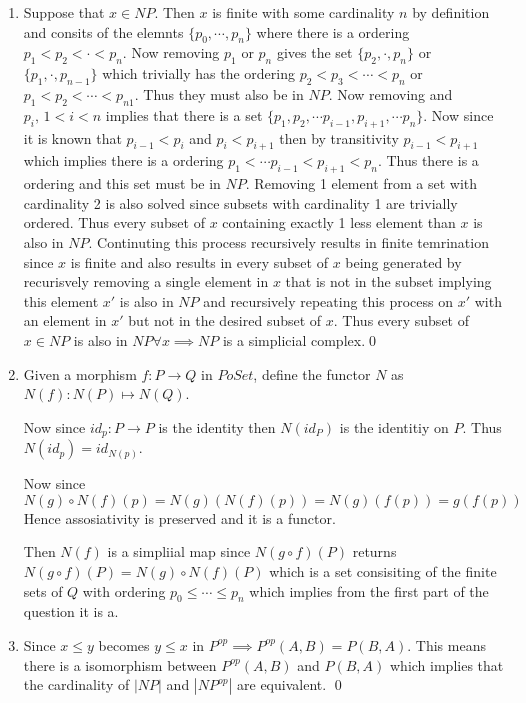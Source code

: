 \documentclass[12pt]{amsart}
\begin{document}
  \newpage
  \begin{problem}
  \begin{enumerate}
    \item 
    Suppose that $x\in NP$. Then $x$ is finite with some cardinality $n$ by definition and consits of the elemnts $\{p_0,\cdots,p_n\}$ where there is a ordering $p_1 < p_2 < \cdot < p_n$. Now removing $p_1$ or $p_n$ gives the set $\{p_2,\cdot, p_n\}$ or $\{p_1,\cdot, p_{n-1}\}$ which trivially has the ordering $p_2 < p_3 < \cdots < p_n$ or $p_1 < p_2 < \cdots < p_{n1}$. Thus they must also be in $NP$.
    Now removing and $p_i,\, 1 < i < n$ implies that there is a set $\{p_1,p_2,\cdots p_{i-1},p_{i+1},\cdots p_n\}$. Now since it is known that $p_{i-1} < p_i$ and $p_i < p_{i+1}$ then by transitivity $p_{i-1} < p_{i+1}$ which implies there is a ordering $p_1 < \cdots p_{i-1} < p_{i+1} < p_n$. 
    Thus there is a ordering and this set must be in $NP$. Removing 1 element from a set with cardinality 2 is also solved since subsets with cardinality 1 are trivially ordered. Thus every subset of $x$ containing exactly 1 less element than $x$ is also in $NP$. 
    Continuting this process recursively results in finite temrination since $x$ is finite and also results in every subset of $x$ being generated by recurisvely removing a single element in $x$ that is not in the subset implying this element $x'$ is also in $NP$ and recursively repeating this process on $x'$ with an element in $x'$ but not in the desired subset of $x$.
    Thus every subset of $x\in NP$ is also in $NP\forall x \implies NP$ is a simplicial complex.\qed 
  
  \item Given a morphism $f:P\to Q$ in $PoSet$, define the functor $N$ as $N(f): N(P)\mapsto N(Q)$. 

    Now since $id_p: P\to P$ is the identity then $N(id_P)$ is the identitiy on $P$. Thus $N(id_p)=id_{N(p)}$. 

    Now since $N(g)\circ N(f)(p) = N(g)(N(f)(p)) = N(g)(f(p)) = g(f(p))$ Hence assosiativity is preserved and it is a functor. 

    Then $N(f)$ is a simpliial map since $N(g\circ f)(P)$ returns $N(g\circ f)(P) = N(g)\circ N(f)(P)$ which is a set consisiting of the finite sets of $Q$ with ordering $p_0 \leq \cdots \leq p_n$ which implies from the first part of the question it is a.  

    \item Since $x\leq y$ becomes $y\leq x$ in $P^{op}\implies P^{op}(A,B) = P(B,A)$. This means there is a isomorphism between $P^{op}(A,B)$ and $P(B,A)$ which implies that the cardinality of $|NP|$ and $|NP^{op}|$ are equivalent. \qed  


\end{enumerate}
\end{problem}
\end{document}

